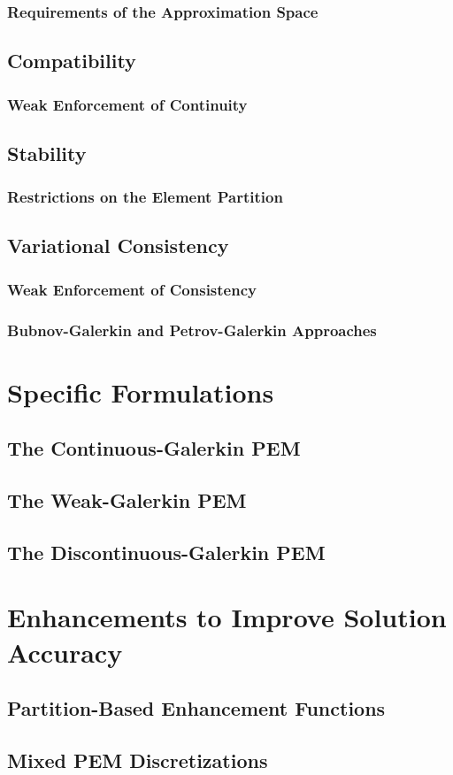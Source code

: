 \subsubsection{Requirements of the Approximation Space}
\subsection{Compatibility}
\subsubsection{Weak Enforcement of Continuity}
\subsection{Stability}
\subsubsection{Restrictions on the Element Partition}
\subsection{Variational Consistency}
\subsubsection{Weak Enforcement of Consistency}
\subsubsection{Bubnov-Galerkin and Petrov-Galerkin Approaches}

\section{Specific Formulations}
\subsection{The Continuous-Galerkin PEM}
\subsection{The Weak-Galerkin PEM}
\subsection{The Discontinuous-Galerkin PEM}

\section{Enhancements to Improve Solution Accuracy}
\subsection{Partition-Based Enhancement Functions}
\subsection{Mixed PEM Discretizations}
